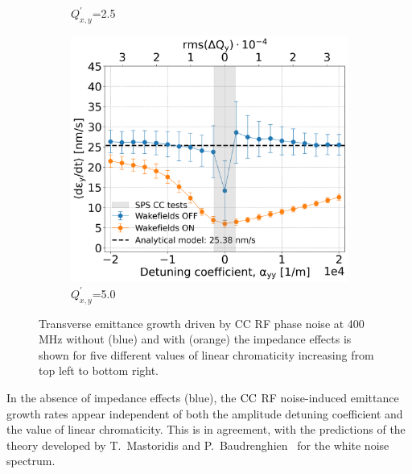 \begin{figure}[htp]
\begin{subfigure}{.45\textwidth}
        \caption{$Q^\prime_{x,y}$=2.5}
        \label{fig:study_6_chroma_scan_Qpxy25e-1}
    \end{subfigure}
    \begin{subfigure}{.45\textwidth}
        \centering
        \includegraphics[width=.95\linewidth]{images/Ch7/Qpx5.png}  
        \caption{$Q^\prime_{x,y}$=5.0}
        \label{fig:study_6_chroma_scan_Qpxy5}
    \end{subfigure}
    \caption{Transverse emittance growth driven by CC RF phase noise at 400\,MHz without (blue) and with (orange) the impedance effects is shown for five different values of linear chromaticity increasing from top left to bottom right.}
    \label{fig:study_6_chroma_scan}
\end{figure}

In the absence of impedance effects (blue), the ${\mathrm{CC}}$ RF noise-induced emittance growth rates appear independent of both the amplitude detuning coefficient and the value of linear chromaticity. This is in agreement, with the predictions of the theory developed by T.~Mastoridis and P.~Baudrenghien~\cite{PhysRevSTAB.18.101001} for the white noise spectrum.

